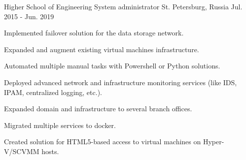 \begin{cventries}
  \cventry
	{Higher School of Engineering} %
	{System administrator} %
	{St. Petersburg, Russia} %
	{Jul. 2015 - Jun. 2019} %
	{
		\begin{cvitems} %
			\item {Implemented failover solution for the data storage network.}
			\item {Expanded and augment existing virtual machines infrastructure.}
			\item {Automated multiple manual tasks with Powershell or Python solutions.}
			\item {Deployed advanced network and infrastructure monitoring services (like IDS, IPAM, centralized logging, etc.).}
			\item {Expanded domain and infrastructure to several branch offices.}
			\item {Migrated multiple services to docker.}
			\item {Created solution for HTML5-based access to virtual machines on Hyper-V/SCVMM hosts.}
		\end{cvitems}
	}

\end{cventries}
